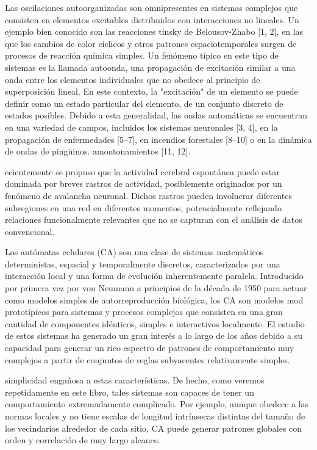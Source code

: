 Las oscilaciones autoorganizadas son omnipresentes en sistemas complejos que consisten en elementos excitables distribuidos con interacciones no lineales. Un ejemplo bien conocido son las reacciones tinsky de Belousov-Zhabo [1, 2], en las que los cambios de color cíclicos y otros patrones espaciotemporales surgen de procesos de reacción química simples. Un fenómeno típico en este tipo de sistemas es la llamada autoonda, una propagación de excitación similar a una onda entre los elementos individuales que no obedece al principio de superposición lineal. En este contexto, la "excitación" de un elemento se puede definir como un estado particular del elemento, de un conjunto discreto de estados posibles. Debido a esta generalidad, las ondas automáticas se encuentran en una variedad de campos, incluidos los sistemas neuronales [3, 4], en la propagación de enfermedades [5–7], en incendios forestales [8–10] o en la dinámica de ondas de pingüinos. amontonamientos [11, 12].

ecientemente se propuso que la actividad cerebral espontánea puede estar dominada por breves rastros de actividad, posiblemente originados por un fenómeno de avalancha neuronal. Dichos rastros pueden involucrar diferentes subregiones en una red en diferentes momentos, potencialmente reflejando relaciones funcionalmente relevantes que no se capturan con el análisis de datos convencional.


Los autómatas celulares (CA) son una clase de sistemas matemáticos deterministas, espacial y temporalmente discretos, caracterizados por una interacción local y una forma de evolución inherentemente paralela. Introducido por primera vez por von Neumann a principios de la década de 1950 para actuar como modelos simples de autorreproducción biológica, los CA son modelos mod prototípicos para sistemas y procesos complejos que consisten en una gran cantidad de componentes idénticos, simples e interactivos localmente. El estudio de estos sistemas ha generado un gran interés a lo largo de los años debido a su capacidad para generar un rico espectro de patrones de comportamiento muy complejos a partir de conjuntos de reglas subyacentes relativamente simples.

simplicidad engañosa a estas características. De hecho, como veremos repetidamente en este libro, tales sistemas son capaces de tener un comportamiento extremadamente complicado. Por ejemplo, aunque obedece a las normas locales y no tiene escalas de longitud intrínsecas distintas del tamaño de los vecindarios alrededor de cada sitio, CA puede generar patrones globales con orden y correlación de muy largo alcance.


